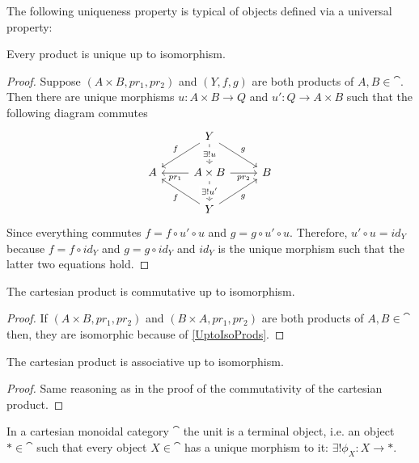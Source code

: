 The following uniqueness property is typical of objects defined via a universal property:
\begin{lem}
\label{UptoIsoProds}
    Every product is unique up to isomorphism.
\end{lem}
\begin{proof}
    Suppose $(A\times B,pr_1,pr_2)$ and $(Y,f,g)$ are both products of $A,B\in\cat$. Then there are unique morphisms $u:A\times B\to Q$ and $u':Q\to A\times B$ such that the following diagram commutes
\[\begin{tikzcd}
    {} & Y \\
    A & {A\times B} & B \\
    & Y
    \arrow["g", from=1-2, to=2-3]
    \arrow["{pr_1}", from=2-2, to=2-1]
    \arrow["f"', from=1-2, to=2-1]
    \arrow["{pr_2}"', from=2-2, to=2-3]
    \arrow["{\exists! u}"{description}, dashed, from=1-2, to=2-2]
    \arrow["{\exists!u'}"{description}, dashed, from=2-2, to=3-2]
    \arrow["f", from=3-2, to=2-1]
    \arrow["g"', from=3-2, to=2-3]
\end{tikzcd}\]
Since everything commutes $f=f\circ u'\circ u$ and $g=g\circ u'\circ u$. Therefore, $u'\circ u=id_Y$ because $f=f\circ id_Y$ and $g=g\circ id_Y$ and $id_Y$ is the unique morphism such that the latter two equations hold.
\end{proof}
\begin{lem}
    The cartesian product is commutative up to isomorphism.
\end{lem}
\begin{proof}
    If $(A\times B,pr_1, pr_2)$ and $(B\times A,pr_1, pr_2)$ are both products of $A,B\in\cat$ then, they are isomorphic because of \ref{UptoIsoProds}.
\end{proof}
\begin{lem}
    The cartesian product is associative up to isomorphism.
\end{lem}
\begin{proof}
    Same reasoning as in the proof of the commutativity of the cartesian product.
\end{proof}
In a cartesian monoidal category $\cat$ the unit is a terminal object, i.e. an object $\ast\in\cat$ such that every object $X\in\cat$ has a unique morphism to it: $\exists !\phi_X:X\to\ast$. 


